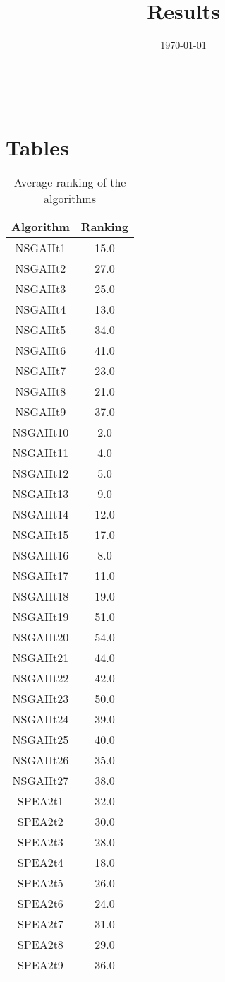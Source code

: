 \documentclass{article}
\title{Results}
\author{}
\date{\today}
\begin{document}
\oddsidemargin 0in \topmargin 0in\maketitle
\
\section{Tables}
\begin{table}[!htp]
\centering
\caption{Average ranking of the algorithms}
\begin{tabular}{c|c}
Algorithm&Ranking\\
\hline
NSGAIIt1&15.0\\
NSGAIIt2&27.0\\
NSGAIIt3&25.0\\
NSGAIIt4&13.0\\
NSGAIIt5&34.0\\
NSGAIIt6&41.0\\
NSGAIIt7&23.0\\
NSGAIIt8&21.0\\
NSGAIIt9&37.0\\
NSGAIIt10&2.0\\
NSGAIIt11&4.0\\
NSGAIIt12&5.0\\
NSGAIIt13&9.0\\
NSGAIIt14&12.0\\
NSGAIIt15&17.0\\
NSGAIIt16&8.0\\
NSGAIIt17&11.0\\
NSGAIIt18&19.0\\
NSGAIIt19&51.0\\
NSGAIIt20&54.0\\
NSGAIIt21&44.0\\
NSGAIIt22&42.0\\
NSGAIIt23&50.0\\
NSGAIIt24&39.0\\
NSGAIIt25&40.0\\
NSGAIIt26&35.0\\
NSGAIIt27&38.0\\
SPEA2t1&32.0\\
SPEA2t2&30.0\\
SPEA2t3&28.0\\
SPEA2t4&18.0\\
SPEA2t5&26.0\\
SPEA2t6&24.0\\
SPEA2t7&31.0\\
SPEA2t8&29.0\\
SPEA2t9&36.0\\

\end{tabular}
\end{table}
\end{document}

